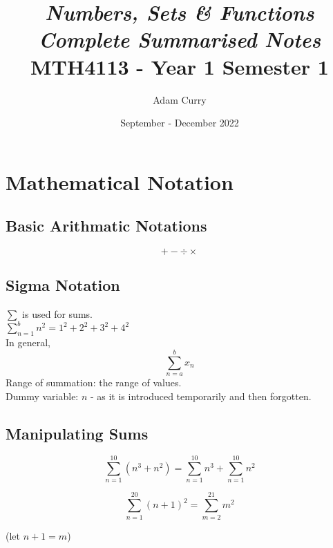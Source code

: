 \documentclass{report}
\title{\huge{\textbf{\textit{Numbers, Sets \& Functions}}}\\
\Large\textbf{\textit{Complete Summarised Notes}}\\
MTH4113 - Year 1 Semester 1}
\author{Adam Curry}
\date{September - December 2022}
\newenvironment{framered}[1][Maroon]
  {\begin{tcolorbox}[colframe=#1,colback=white]}
  {\end{tcolorbox}}
\begin{document}
\maketitle
\tableofcontents
\chapter{Mathematical Notation}
\section{Basic Arithmatic Notations}

\begin{equation*}
    + - \div \times
\end{equation*}

\section{Sigma Notation}

$\sum$ is used for sums.\\
$\sum_{n=1}^b n^2 = 1^2 + 2^2 + 3^2 + 4^2$\\
In general,
\begin{equation*}
    \sum_{n=a}^b x_n
\end{equation*}
Range of summation: the range of values.\\
Dummy variable: $n$ - as it is introduced temporarily and then forgotten.

\section{Manipulating Sums}

\begin{framered}
\begin{equation*}
    \sum_{n=1}^{10} (n^3+n^2) = \sum_{n=1}^{10} n^3 + \sum_{n=1}^{10} n^2
\end{equation*}

\begin{equation*}
    \sum_{n=1}^{20} (n+1)^2 = \sum_{m=2}^{21} m^2
\end{equation*}

\begin{flushright}
(let $n+1 = m$)
\end{flushright}
\end{framered}
\end{document}
